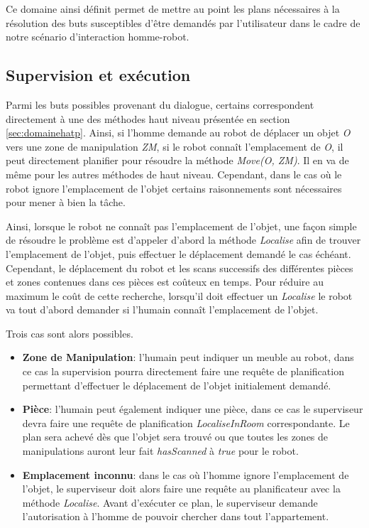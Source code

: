 \documentclass[a4paper,11pt,twoside]{StyleThese}
\begin{document}
Ce domaine ainsi définit permet de mettre au point les plans nécessaires à la résolution des buts susceptibles d'être demandés par l'utilisateur dans le cadre de notre scénario d'interaction homme-robot.


\subsection{Supervision et exécution}

Parmi les buts possibles provenant du dialogue, certains correspondent directement à une des méthodes haut niveau présentée en section \ref{sec:domainehatp}.
Ainsi, si l'homme demande au robot de déplacer un objet \textit{O} vers une zone de manipulation \textit{ZM}, si le robot connaît l'emplacement de \textit{O}, il peut directement planifier pour résoudre la méthode \textit{Move(O, ZM)}. Il en va de même pour les autres méthodes de haut niveau. Cependant, dans le cas où le robot ignore l'emplacement de l'objet certains raisonnements sont nécessaires pour mener à bien la tâche.

Ainsi, lorsque le robot ne connaît pas l'emplacement de l'objet, une façon simple de résoudre le problème est d'appeler d'abord la méthode \textit{Localise} afin de trouver l'emplacement de l'objet, puis effectuer le déplacement demandé le cas échéant. Cependant, le déplacement du robot et les scans successifs des différentes pièces et zones contenues dans ces pièces est coûteux en temps.
Pour réduire au maximum le coût de cette recherche, lorsqu'il doit effectuer un \textit{Localise} le robot va tout d'abord demander si l'humain connaît l'emplacement de l'objet.

Trois cas sont alors possibles.
\begin{itemize}
\item \textbf{Zone de Manipulation}: l'humain peut indiquer un meuble au robot, dans ce cas la supervision pourra directement faire une requête de planification permettant d'effectuer le déplacement de l'objet initialement demandé.

\item \textbf{Pièce}: l'humain peut également indiquer une pièce, dans ce cas le superviseur devra faire une requête de planification \textit{LocaliseInRoom} correspondante. Le plan sera achevé dès que l'objet sera trouvé ou que toutes les zones de manipulations auront leur fait \textit{hasScanned} à \textit{true} pour le robot.

\item \textbf{Emplacement inconnu}: dans le cas où l'homme ignore l'emplacement de l'objet, le superviseur doit alors faire une requête au planificateur avec la méthode \textit{Localise}. Avant d'exécuter ce plan, le superviseur demande l'autorisation à l'homme de pouvoir chercher dans tout l'appartement.
\end{itemize}  
\end{document}
